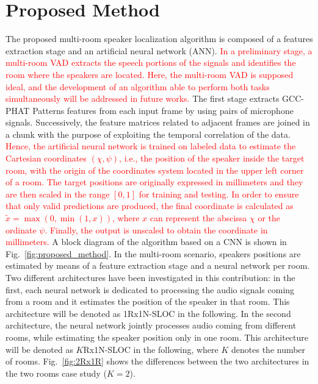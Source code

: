 \documentclass[review]{elsarticle}
\newcommand{\figref}[1]{Fig.~\ref{#1}}
\begin{document}
\section{Proposed Method}\label{sec:ALGO}
The proposed multi-room speaker localization algorithm is composed of a features extraction stage and an artificial neural network (ANN). \textcolor{red}{In a preliminary stage, a multi-room VAD \cite{ferronineural,vesperini2016deep} extracts the speech portions of the signals and identifies the room where the speakers are located. Here, the multi-room VAD is supposed ideal, and the development of an algorithm able to perform both tasks simultaneously will be addressed in future works.} The first stage extracts GCC-PHAT Patterns features from each input frame by using pairs of microphone signals. Successively, the feature matrices related to adjacent frames are joined in a chunk  with the purpose of exploiting the temporal correlation of the data. \textcolor{red}{Hence, the artificial neural network is trained on labeled data to estimate the Cartesian coordinates $\left ( \chi,\psi \right )$, i.e., the position of the speaker inside the target room, with the origin of the coordinates system located in the upper left corner of a room. The target positions are originally expressed in millimeters and they are then scaled in the range $[0,1]$ for training and testing. In order to ensure that only valid predictions are produced, the final coordinate is calculated as $\tilde{x} =\max(0, \min(1, x))$, where $x$ can represent the abscissa $\chi$ or the ordinate $\psi$. Finally, the output is unscaled to obtain the coordinate in millimeters.} A block diagram of the algorithm based on a CNN is shown in \figref{fig:proposed_method}.
In the multi-room scenario, speakers positions are estimated by means of a feature extraction stage and a neural network per room. Two different architectures have been investigated in this contribution: in the first, each neural network is dedicated to processing the audio signals coming from a room and it estimates the position of the speaker in that room. This architecture will be denoted as 1Rx1N-SLOC in the following. In the second architecture, the neural network jointly processes audio coming from different rooms, while estimating the speaker position only in one room. This architecture will be denoted as $K$Rx1N-SLOC in the following, where $K$ denotes the number of rooms. \figref{fig:2Rx1R} shows the differences between the two architectures in the two rooms case study ($K=2$). %
\end{document}
